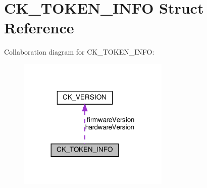 \hypertarget{struct_c_k___t_o_k_e_n___i_n_f_o}{}\section{C\+K\+\_\+\+T\+O\+K\+E\+N\+\_\+\+I\+N\+FO Struct Reference}
\label{struct_c_k___t_o_k_e_n___i_n_f_o}


Collaboration diagram for C\+K\+\_\+\+T\+O\+K\+E\+N\+\_\+\+I\+N\+FO\+:
\nopagebreak
\begin{figure}[H]
\begin{center}
\leavevmode
\includegraphics[width=204pt]{struct_c_k___t_o_k_e_n___i_n_f_o__coll__graph}
\end{center}
\end{figure}
